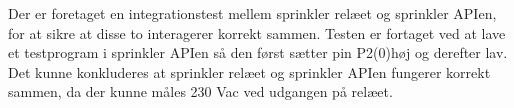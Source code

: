 
Der er foretaget en integrationstest mellem sprinkler relæet og sprinkler APIen, for at sikre at disse to interagerer korrekt sammen. Testen er fortaget ved at lave et testprogram i sprinkler APIen så den først sætter pin P2(0)høj og derefter lav. Det kunne konkluderes at sprinkler relæet og sprinkler APIen fungerer korrekt sammen, da der kunne måles 230 Vac ved udgangen på relæet.  



